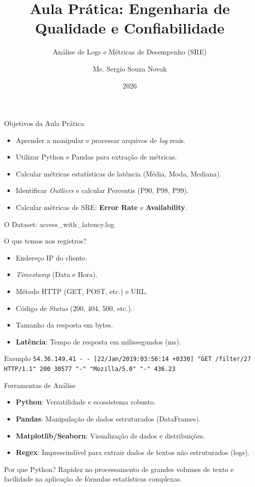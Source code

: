 \documentclass[9pt]{beamer}
\title[Prática: Análise de Logs]{Aula Prática: Engenharia de Qualidade e Confiabilidade}
\subtitle{Análise de Logs e Métricas de Desempenho (SRE)}
\author{Me. Sergio Souza Novak}
\institute[UniRV]{Faculdade de Engenharia de Software \\ Universidade de Rio Verde}
\date{2026}
\begin{document}
\begin{frame}[plain]
    \titlepage
\end{frame}

\begin{frame}{Objetivos da Aula Prática}
    \begin{itemize}
        \item Aprender a manipular e processar arquivos de \textit{log} reais.
        \item Utilizar Python e Pandas para extração de métricas.
        \item Calcular métricas estatísticas de latência (Média, Moda, Mediana).
        \item Identificar \textit{Outliers} e calcular Percentis (P90, P98, P99).
        \item Calcular métricas de SRE: \textbf{Error Rate} e \textbf{Availability}.
    \end{itemize}
\end{frame}

\begin{frame}{O Dataset: access\_with\_latency.log}
    \begin{block}{O que temos nos registros?}
        \begin{itemize}
            \item Endereço IP do cliente.
            \item \textit{Timestamp} (Data e Hora).
            \item Método HTTP (GET, POST, etc.) e URL.
            \item Código de \textit{Status} (200, 404, 500, etc.).
            \item Tamanho da resposta em bytes.
            \item \textbf{Latência}: Tempo de resposta em milissegundos (ms).
        \end{itemize}
    \end{block}
    \begin{exampleblock}{Exemplo}
        \texttt{54.36.149.41 - - [22/Jan/2019:03:56:14 +0330] "GET /filter/27 HTTP/1.1" 200 30577 "-" "Mozilla/5.0" "-" 436.23}
    \end{exampleblock}
\end{frame}

\begin{frame}{Ferramentas de Análise}
    \begin{itemize}
        \item \textbf{Python}: Versatilidade e ecossistema robusto.
        \item \textbf{Pandas}: Manipulação de dados estruturados (DataFrames).
        \item \textbf{Matplotlib/Seaborn}: Visualização de dados e distribuições.
        \item \textbf{Regex}: Imprescindível para extrair dados de textos não estruturados (logs).
    \end{itemize}
    \begin{block}{Por que Python?}
        Rapidez no processamento de grandes volumes de texto e facilidade na aplicação de fórmulas estatísticas complexas.
    \end{block}
\end{frame}
\end{document}
